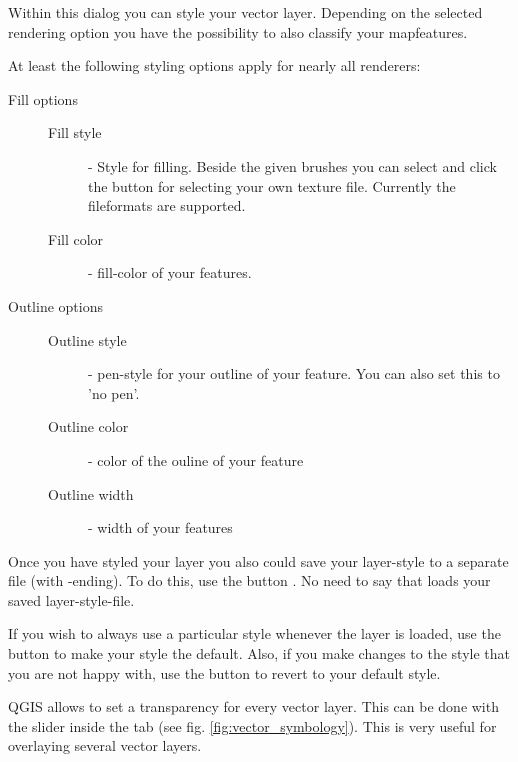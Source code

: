 
 \label{sec:style_options} 
Within this dialog you can style your vector layer. Depending on the selected
rendering option you have the possibility to also classify your mapfeatures.

At least the following styling options apply for nearly all renderers:
\begin{description}
\item[Fill options]
\begin{description}
 \item[Fill style] - Style for filling. Beside the given brushes you can
 select  and click the \browsebutton
 button for selecting your own texture file. Currently the fileformats
  are supported.
 \item[Fill color] - fill-color of your features.
\end{description}
\item[Outline options]
\begin{description}
 \item[Outline style] - pen-style for your outline of your feature. You can
 also set this to 'no pen'.
 \item[Outline color] - color of the ouline of your feature
 \item[Outline width] - width of your features
\end{description}
\end{description}

Once you have styled your layer you also could save your layer-style to a
separate file (with -ending).
To do this, use the button . No need to say that
 loads your saved layer-style-file.

If you wish to always use a particular style whenever the layer is loaded, 
use the  button to make your style the default. Also, 
if you make changes to the style that you are not happy with, use the  button to revert to your default style.

 \label{sec:vect_transparency} 
QGIS allows to set a transparency for every vector layer. This can be done with
the slider  inside the  tab (see
fig. \ref{fig:vector_symbology}). This is very useful for overlaying several
vector layers.

